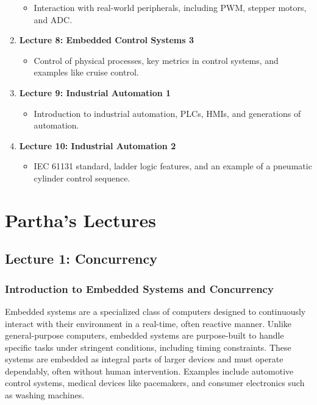 \documentclass[
  14pt,
  a4paper,
  DIV=11,
  numbers=noendperiod,
  headinclude=true,
  footinclude=true]{scrreprt}
\providecommand{\tightlist}{%
  \setlength{\itemsep}{0pt}\setlength{\parskip}{0pt}}\usepackage{longtable,booktabs,array}
\begin{document}
\begin{enumerate}
  \begin{itemize}
  \tightlist
  \item
    Interaction with real-world peripherals, including PWM, stepper
    motors, and ADC.
  \end{itemize}
\item
  \textbf{Lecture 8: Embedded Control Systems 3}

  \begin{itemize}
  \tightlist
  \item
    Control of physical processes, key metrics in control systems, and
    examples like cruise control.
  \end{itemize}
\item
  \textbf{Lecture 9: Industrial Automation 1}

  \begin{itemize}
  \tightlist
  \item
    Introduction to industrial automation, PLCs, HMIs, and generations
    of automation.
  \end{itemize}
\item
  \textbf{Lecture 10: Industrial Automation 2}

  \begin{itemize}
  \tightlist
  \item
    IEC 61131 standard, ladder logic features, and an example of a
    pneumatic cylinder control sequence.
  \end{itemize}
\end{enumerate}

\part{Partha's Lectures}

\chapter{Lecture 1: Concurrency}\label{lecture-1-concurrency}

\section{Introduction to Embedded Systems and
Concurrency}\label{introduction-to-embedded-systems-and-concurrency}

Embedded systems are a specialized class of computers designed to
continuously interact with their environment in a real-time, often
reactive manner. Unlike general-purpose computers, embedded systems are
purpose-built to handle specific tasks under stringent conditions,
including timing constraints. These systems are embedded as integral
parts of larger devices and must operate dependably, often without human
intervention. Examples include automotive control systems, medical
devices like pacemakers, and consumer electronics such as washing
machines.
\end{document}
